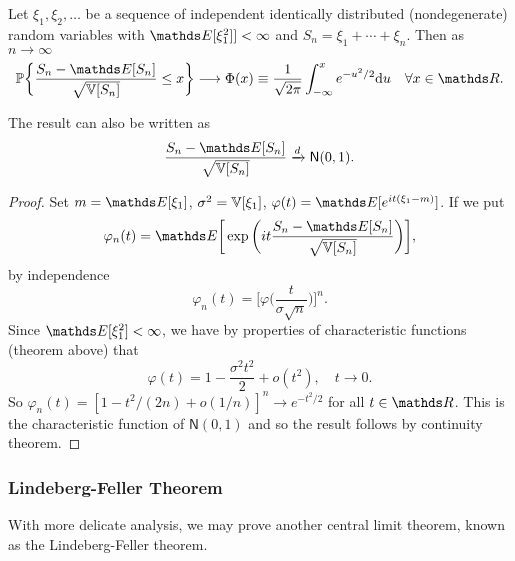\begin{theorem}
Let $\xi_1, \xi_2, \dots $ be a sequence of independent identically distributed (nondegenerate) random variables with $\E[\xi_1^2]] < \infty$ and $S_n = \xi_1 + \cdots + \xi_n$. Then as $n \to \infty$
\begin{equation*}
    \p \bigg\{ \frac{S_n - \E[S_n]}{\sqrt{\V[S_n]}} \le x \bigg\} \longrightarrow \Phi(x) \equiv \frac{1}{\sqrt{2\pi}} \int_{-\infty}^x e^{-u^2/2} \d u \quad \forall x \in \R.
\end{equation*}
\end{theorem}
\begin{remark}
The result can also be written as 
\begin{equation*}
    \frac{S_n - \E[S_n]}{\sqrt{\V[S_n]}} \xrightarrow{d} \mathsf{N}(0,1).
\end{equation*}
\end{remark}
\begin{proof}
Set $m = \E[\xi_1]$, $\sigma^2 = \mathbb{V}[\xi_1]$, $\varphi(t) = \E[e^{it(\xi_1 - m)}]$.
If we put
\begin{equation*}
    \varphi_n(t) = \E\bigg[\exp \bigg(it \frac{S_n - \E[S_n]}{\sqrt{\V[S_n]}} \bigg)\bigg],
\end{equation*}
by independence 
\begin{equation*}
    \varphi_n(t) = \bigg[\varphi\bigg(\frac{t}{\sigma \sqrt{n}}\bigg)\bigg]^n.
\end{equation*}
Since $\E[\xi_1^2] < \infty$, we have by properties of characteristic functions (theorem above) that 
\begin{equation*}
    \varphi(t) = 1 - \frac{\sigma^2 t^2}{2} + o(t^2), \quad t \to 0.
\end{equation*}
So $\varphi_n(t) = [1 - t^2/(2n) + o(1/n)]^n \to e^{-t^2/2}$ for all $t \in \R$. This is the characteristic function of $\mathsf{N}(0,1)$ and so the result follows by continuity theorem.
\end{proof}

\subsubsection{Lindeberg-Feller Theorem}
With more delicate analysis, we may prove another central limit theorem, known as the Lindeberg-Feller theorem.

